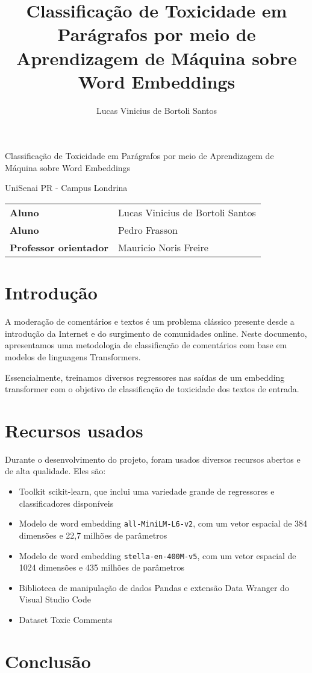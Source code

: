 \documentclass{article}
\title{Classificação de Toxicidade em Parágrafos por meio de Aprendizagem de Máquina sobre Word Embeddings}
\author{Lucas Vinicius de Bortoli Santos}
\begin{document}

\begin{titlepage}
    \begin{center}
        \Huge{Classificação de Toxicidade em Parágrafos por meio de Aprendizagem de Máquina sobre Word Embeddings}
        \vspace{64pt}

        \large{UniSenai PR - Campus Londrina}
        \vspace{48pt}

        \begin{tabular}{l l}
            \textbf{Aluno}                & Lucas Vinicius de Bortoli Santos \\
            \textbf{Aluno}                & Pedro Frasson                    \\
            \textbf{Professor orientador} & Mauricio Noris Freire
        \end{tabular}
    \end{center}
\end{titlepage}

\newpage

\tableofcontents

\newpage
\section{Introdução}

A moderação de comentários e textos é um problema clássico presente desde a introdução da Internet e do surgimento de comunidades online. Neste documento, apresentamos uma metodologia de classificação de comentários com base em modelos de linguagens Transformers.

Essencialmente, treinamos diversos regressores nas saídas de um embedding transformer com o objetivo de classificação de toxicidade dos textos de entrada.

\section{Recursos usados}

Durante o desenvolvimento do projeto, foram usados diversos recursos abertos e de alta qualidade. Eles são:

\begin{itemize}
    \item Toolkit scikit-learn, que inclui uma variedade grande de regressores e classificadores disponíveis
    \item Modelo de word embedding \texttt{all-MiniLM-L6-v2}, com um vetor espacial de 384 dimensões e 22,7 milhões de parâmetros
    \item Modelo de word embedding \texttt{stella-en-400M-v5}, com um vetor espacial de 1024 dimensões e 435 milhões de parâmetros
    \item Biblioteca de manipulação de dados Pandas e extensão Data Wranger do Visual Studio Code
    \item Dataset Toxic Comments\cite{Huggingface:SetFit/toxic_conversations}
\end{itemize}

\newpage
\section{Conclusão}

\newpage

\printbibliography
\end{document}
